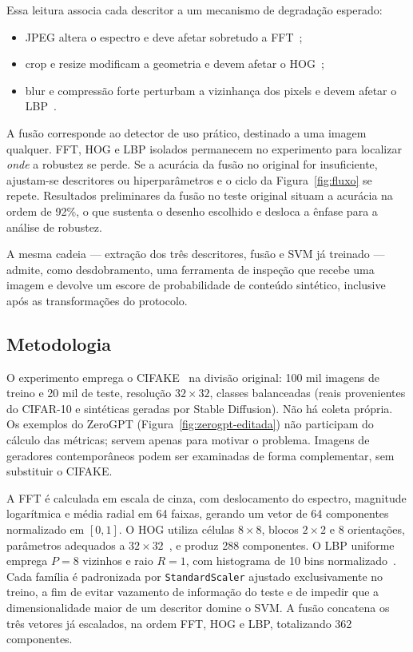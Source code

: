 \documentclass[12pt]{article}
\begin{document}
Essa leitura associa cada descritor a um mecanismo de degradação esperado:

\begin{itemize}
\item JPEG altera o espectro e deve afetar sobretudo a FFT~\cite{bammey2024synthbuster};
\item crop e resize modificam a geometria e devem afetar o HOG~\cite{choi2025warpad,dalal2005hog};
\item blur e compressão forte perturbam a vizinhança dos pixels e devem afetar o LBP~\cite{ojala2002lbp}.
\end{itemize}

A fusão corresponde ao detector de uso prático, destinado a uma imagem qualquer. FFT, HOG e LBP isolados permanecem no experimento para localizar \emph{onde} a robustez se perde. Se a acurácia da fusão no original for insuficiente, ajustam-se descritores ou hiperparâmetros e o ciclo da Figura~\ref{fig:fluxo} se repete. Resultados preliminares da fusão no teste original situam a acurácia na ordem de 92\%, o que sustenta o desenho escolhido e desloca a ênfase para a análise de robustez.

A mesma cadeia --- extração dos três descritores, fusão e SVM já treinado --- admite, como desdobramento, uma ferramenta de inspeção que recebe uma imagem e devolve um escore de probabilidade de conteúdo sintético, inclusive após as transformações do protocolo.

\subsection{Metodologia}

O experimento emprega o CIFAKE~\cite{bird2024cifake} na divisão original: 100 mil imagens de treino e 20 mil de teste, resolução $32{\times}32$, classes balanceadas (reais provenientes do CIFAR-10 e sintéticas geradas por Stable Diffusion). Não há coleta própria. Os exemplos do ZeroGPT (Figura~\ref{fig:zerogpt-editada}) não participam do cálculo das métricas; servem apenas para motivar o problema. Imagens de geradores contemporâneos podem ser examinadas de forma complementar, sem substituir o CIFAKE.

A FFT é calculada em escala de cinza, com deslocamento do espectro, magnitude logarítmica e média radial em 64 faixas, gerando um vetor de 64 componentes normalizado em $[0,1]$. O HOG utiliza células $8{\times}8$, blocos $2{\times}2$ e 8 orientações, parâmetros adequados a $32{\times}32$~\cite{dalal2005hog}, e produz 288 componentes. O LBP uniforme emprega $P=8$ vizinhos e raio $R=1$, com histograma de 10 bins normalizado~\cite{ojala2002lbp}. Cada família é padronizada por \texttt{StandardScaler} ajustado exclusivamente no treino, a fim de evitar vazamento de informação do teste e de impedir que a dimensionalidade maior de um descritor domine o SVM. A fusão concatena os três vetores já escalados, na ordem FFT, HOG e LBP, totalizando 362 componentes.
\end{document}
